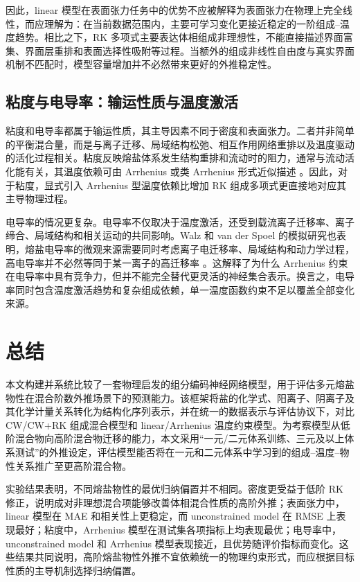 \documentclass[journal=jctcce,manuscript=article,doi=true]{achemso}
\begin{document}
因此，linear 模型在表面张力任务中的优势不应被解释为表面张力在物理上完全线性，而应理解为：在当前数据范围内，主要可学习变化更接近稳定的一阶组成--温度趋势。相比之下，RK 多项式主要表达体相组成非理想性，不能直接描述界面富集、界面层重排和表面选择性吸附等过程。当额外的组成非线性自由度与真实界面机制不匹配时，模型容量增加并不必然带来更好的外推稳定性。

\subsection{粘度与电导率：输运性质与温度激活}\label{ux7c98ux5ea6ux4e0eux7535ux5bfcux7387ux8f93ux8fd0ux6027ux8d28ux4e0eux6e29ux5ea6ux6fc0ux6d3b}

粘度和电导率都属于输运性质，其主导因素不同于密度和表面张力。二者并非简单的平衡混合量，而是与离子迁移、局域结构松弛、相互作用网络重排以及温度驱动的活化过程相关。粘度反映熔盐体系发生结构重排和流动时的阻力，通常与流动活化能有关，其温度依赖可由 Arrhenius 或类 Arrhenius 形式近似描述 \cite{janz1988molten,zhao2023viscosity}。因此，对于粘度，显式引入 Arrhenius 型温度依赖比增加 RK 组成多项式更直接地对应其主导物理过程。

电导率的情况更复杂。电导率不仅取决于温度激活，还受到载流离子迁移率、离子缔合、局域结构和相关运动的共同影响。Walz 和 van der Spoel 的模拟研究也表明，熔盐电导率的微观来源需要同时考虑离子电迁移率、局域结构和动力学过程，高电导率并不必然等同于某一离子的高迁移率 \cite{walz2021microscopic}。这解释了为什么 Arrhenius 约束在电导率中具有竞争力，但并不能完全替代更灵活的神经集合表示。换言之，电导率同时包含温度激活趋势和复杂组成依赖，单一温度函数约束不足以覆盖全部变化来源。

\section{总结}\label{ux603bux7ed3}

本文构建并系统比较了一套物理启发的组分编码神经网络模型，用于评估多元熔盐物性在混合阶数外推场景下的预测能力。该框架将盐的化学式、阳离子、阴离子及其化学计量关系转化为结构化序列表示，并在统一的数据表示与评估协议下，对比 CW/CW+RK 组成混合模型和 linear/Arrhenius 温度约束模型。为考察模型从低阶混合物向高阶混合物迁移的能力，本文采用“一元/二元体系训练、三元及以上体系测试”的外推设定，评估模型能否将在一元和二元体系中学习到的组成--温度--物性关系推广至更高阶混合物。

实验结果表明，不同熔盐物性的最优归纳偏置并不相同。密度更受益于低阶 RK 修正，说明成对非理想混合项能够改善体相混合性质的高阶外推；表面张力中，linear 模型在 MAE 和相关性上更稳定，而 unconstrained model 在 RMSE 上表现最好；粘度中，Arrhenius 模型在测试集各项指标上均表现最优；电导率中，unconstrained model 和 Arrhenius 模型表现接近，且优势随评价指标而变化。这些结果共同说明，高阶熔盐物性外推不宜依赖统一的物理约束形式，而应根据目标性质的主导机制选择归纳偏置。
\end{document}
